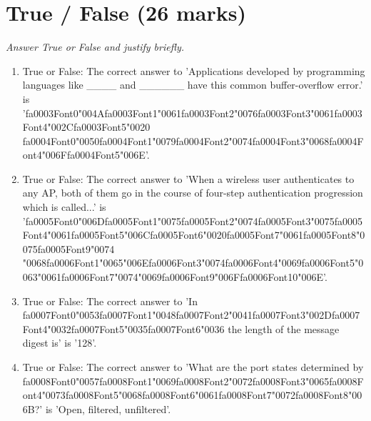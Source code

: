\documentclass[12pt]{article}
\begin{document}
\section*{True / False (26 marks)}
\textit{Answer True or False and justify briefly.}
\begin{enumerate}[label=\arabic*.]
\item True or False: The correct answer to 'Applications developed by programming languages like \_\_\_\_ and \_\_\_\_\_\_ have this common buffer-overflow error.' is '{\csname fa0003Font0\endcsname\char"004A}{\csname fa0003Font1\endcsname\char"0061}{\csname fa0003Font2\endcsname\char"0076}{\csname fa0003Font3\endcsname\char"0061}{\csname fa0003Font4\endcsname\char"002C}{\csname fa0003Font5\endcsname\char"0020} {\csname fa0004Font0\endcsname\char"0050}{\csname fa0004Font1\endcsname\char"0079}{\csname fa0004Font2\endcsname\char"0074}{\csname fa0004Font3\endcsname\char"0068}{\csname fa0004Font4\endcsname\char"006F}{\csname fa0004Font5\endcsname\char"006E}'.
\item True or False: The correct answer to 'When a wireless user authenticates to any AP, both of them go in the course of four-step authentication progression which is called...' is '{\csname fa0005Font0\endcsname\char"006D}{\csname fa0005Font1\endcsname\char"0075}{\csname fa0005Font2\endcsname\char"0074}{\csname fa0005Font3\endcsname\char"0075}{\csname fa0005Font4\endcsname\char"0061}{\csname fa0005Font5\endcsname\char"006C}{\csname fa0005Font6\endcsname\char"0020}{\csname fa0005Font7\endcsname\char"0061}{\csname fa0005Font8\endcsname\char"0075}{\csname fa0005Font9\endcsname\char"0074} {\char"0068}{\csname fa0006Font1\endcsname\char"0065}{\char"006E}{\csname fa0006Font3\endcsname\char"0074}{\csname fa0006Font4\endcsname\char"0069}{\csname fa0006Font5\endcsname\char"0063}{\char"0061}{\csname fa0006Font7\endcsname\char"0074}{\char"0069}{\csname fa0006Font9\endcsname\char"006F}{\csname fa0006Font10\endcsname\char"006E}'.
\item True or False: The correct answer to 'In {\csname fa0007Font0\endcsname\char"0053}{\csname fa0007Font1\endcsname\char"0048}{\csname fa0007Font2\endcsname\char"0041}{\csname fa0007Font3\endcsname\char"002D}{\csname fa0007Font4\endcsname\char"0032}{\csname fa0007Font5\endcsname\char"0035}{\csname fa0007Font6\endcsname\char"0036} the length of the message digest is' is '128'.
\item True or False: The correct answer to 'What are the port states determined by {\csname fa0008Font0\endcsname\char"0057}{\csname fa0008Font1\endcsname\char"0069}{\csname fa0008Font2\endcsname\char"0072}{\csname fa0008Font3\endcsname\char"0065}{\csname fa0008Font4\endcsname\char"0073}{\csname fa0008Font5\endcsname\char"0068}{\csname fa0008Font6\endcsname\char"0061}{\csname fa0008Font7\endcsname\char"0072}{\csname fa0008Font8\endcsname\char"006B}?' is 'Open, filtered, unfiltered'.

\end{enumerate}
\end{document}

